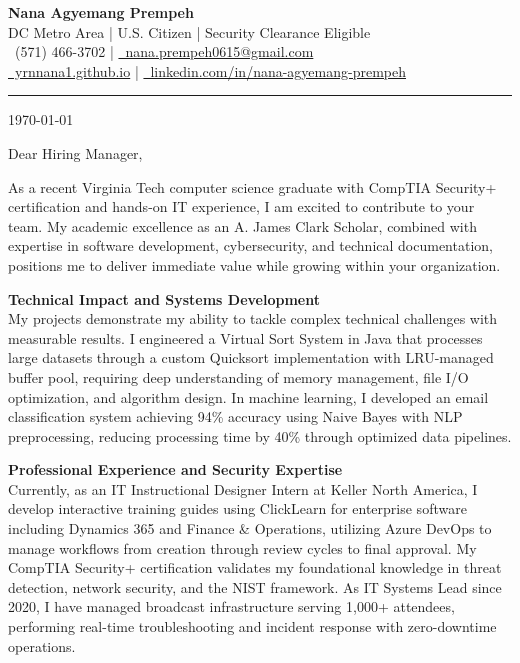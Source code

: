 \documentclass[12pt,letterpaper]{article}
\begin{document}
\begin{center}
{\Large \textbf{Nana Agyemang Prempeh}} \\
DC Metro Area | U.S. Citizen | Security Clearance Eligible \\
\faPhone\ (571) 466-3702 | \href{mailto:nana.prempeh0615@gmail.com}{\faEnvelope\ nana.prempeh0615@gmail.com} \\
\href{https://yrnnana1.github.io/}{\faGlobe\ yrnnana1.github.io} | \href{https://linkedin.com/in/nana-agyemang-prempeh}{\faLinkedin\ linkedin.com/in/nana-agyemang-prempeh}
\end{center}
\vspace{0.3cm}
\rule{\textwidth}{0.5pt}
\vspace{0.3cm}
\today

Dear Hiring Manager,

As a recent Virginia Tech computer science graduate with CompTIA Security+ certification and hands-on IT experience, I am excited to contribute to your team. My academic excellence as an A. James Clark Scholar, combined with expertise in software development, cybersecurity, and technical documentation, positions me to deliver immediate value while growing within your organization.

\textbf{Technical Impact and Systems Development} \\
My projects demonstrate my ability to tackle complex technical challenges with measurable results. I engineered a Virtual Sort System in Java that processes large datasets through a custom Quicksort implementation with LRU-managed buffer pool, requiring deep understanding of memory management, file I/O optimization, and algorithm design. In machine learning, I developed an email classification system achieving 94\% accuracy using Naive Bayes with NLP preprocessing, reducing processing time by 40\% through optimized data pipelines.

\textbf{Professional Experience and Security Expertise} \\
Currently, as an IT Instructional Designer Intern at Keller North America, I develop interactive training guides using ClickLearn for enterprise software including Dynamics 365 and Finance \& Operations, utilizing Azure DevOps to manage workflows from creation through review cycles to final approval. My CompTIA Security+ certification validates my foundational knowledge in threat detection, network security, and the NIST framework. As IT Systems Lead since 2020, I have managed broadcast infrastructure serving 1,000+ attendees, performing real-time troubleshooting and incident response with zero-downtime operations.
\end{document}
